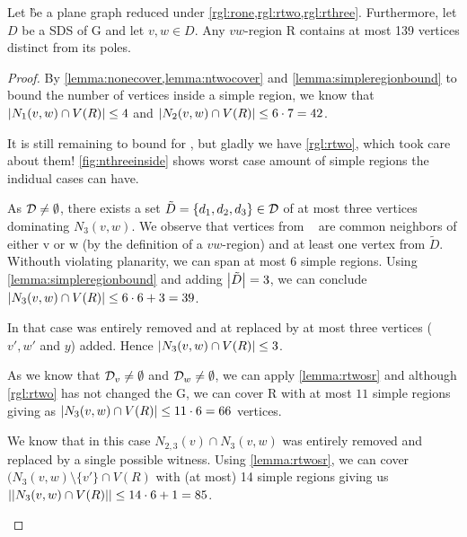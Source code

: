 \begin{lemma}\label{lemma:outside}
    Let \G be a plane graph reduced under \cref{rgl:rone,rgl:rtwo,rgl:rthree}. Furthermore, let $D$ be a SDS of G and let $v,w \in D$. Any $vw$-region R contains at most 139 vertices distinct from its poles.
\end{lemma}
\begin{proof} 
    By \cref{lemma:nonecover,lemma:ntwocover} and \cref{lemma:simpleregionbound} to bound the number of vertices inside a simple region, we know that $\abs{N_1(v,w) \cap V(R)} \leq 4$ and $\abs{N_2(v,w) \cap V(R)} \leq 6 \cdot 7 = 42$.
    
    It is still remaining to bound for \nthi, but gladly we have \cref{rgl:rtwo}, which took care about them! \cref{fig:nthreeinside} shows worst case amount of simple regions the indidual cases can have.
    
    \begin{caseofz}
         As $\mathcal{D} \neq \emptyset$, there exists a set $\tilde D = \{d_1,d_2,d_3\} \in \mathcal{D}$ of at most three vertices dominating $N_3(v,w)$. We observe that vertices from \nthi~ are common neighbors of either v or w (by the definition of a $vw$-region) and at least one vertex from $\tilde D$. Withouth violating planarity, we can span at most 6 simple regions. Using \cref{lemma:simpleregionbound} and adding $\abs{\tilde D} = 3$, we can conclude $\abs{N_3(v,w) \cap V(R)} \leq 6 \cdot 6 + 3 = 39$.
        
        In that case \ntwi was entirely removed and at \nthi replaced by at most three vertices ($v', w'$ and $y$) added. Hence $\abs{N_3(v,w) \cap V(R)} \leq 3$.
        
         As we know that $\mathcal{D}_{v} \neq \emptyset$ and $\mathcal{D}_{w} \neq \emptyset$, we can apply \cref{lemma:rtwosr} and although \cref{rgl:rtwo} has not changed the G, we can cover R with at most $11$ simple regions giving as $\abs{N_3(v,w) \cap V(R)} \leq 11 \cdot 6 = 66$ vertices. 
        
         We know that in this case $N_{2,3}(v) \cap N_3(v,w)$ was entirely removed and replaced by a single possible witness. Using \cref{lemma:rtwosr}, we can cover $(N_3(v,w) \setminus \{v'\} \cap V(R)$ with (at most) 14 simple regions giving us $\abs{\abs{N_3(v,w) \cap V(R)}} \leq 14 \cdot 6 + 1 = 85$.
    \end{caseofz}
    

\end{proof}
